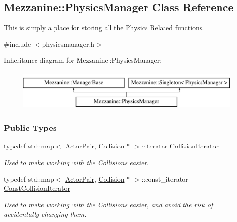 \hypertarget{classMezzanine_1_1PhysicsManager}{
\subsection{Mezzanine::PhysicsManager Class Reference}
\label{classMezzanine_1_1PhysicsManager}
}


This is simply a place for storing all the Physics Related functions.  




{\ttfamily \#include $<$physicsmanager.h$>$}

Inheritance diagram for Mezzanine::PhysicsManager:\begin{figure}[H]
\begin{center}
\leavevmode
\includegraphics[height=2.000000cm]{classMezzanine_1_1PhysicsManager}
\end{center}
\end{figure}
\subsubsection*{Public Types}
\begin{DoxyCompactItemize}
\item 
\hypertarget{classMezzanine_1_1PhysicsManager_a930a032df1bf01b9f93ba4e815a433c2}{
typedef std::map$<$ \hyperlink{classMezzanine_1_1ActorPair}{ActorPair}, \hyperlink{classMezzanine_1_1Collision}{Collision} $\ast$ $>$::iterator \hyperlink{classMezzanine_1_1PhysicsManager_a930a032df1bf01b9f93ba4e815a433c2}{CollisionIterator}}
\label{classMezzanine_1_1PhysicsManager_a930a032df1bf01b9f93ba4e815a433c2}

\begin{DoxyCompactList}\small\item\em Used to make working with the Collisions easier. \item\end{DoxyCompactList}\item 
\hypertarget{classMezzanine_1_1PhysicsManager_a62c722b08b8fa0f015fe2b375c452dde}{
typedef std::map$<$ \hyperlink{classMezzanine_1_1ActorPair}{ActorPair}, \hyperlink{classMezzanine_1_1Collision}{Collision} $\ast$ $>$::const\_\-iterator \hyperlink{classMezzanine_1_1PhysicsManager_a62c722b08b8fa0f015fe2b375c452dde}{ConstCollisionIterator}}
\label{classMezzanine_1_1PhysicsManager_a62c722b08b8fa0f015fe2b375c452dde}

\begin{DoxyCompactList}\small\item\em Used to make working with the Collisions easier, and avoid the risk of accidentally changing them. \item\end{DoxyCompactList}\end{DoxyCompactItemize}
